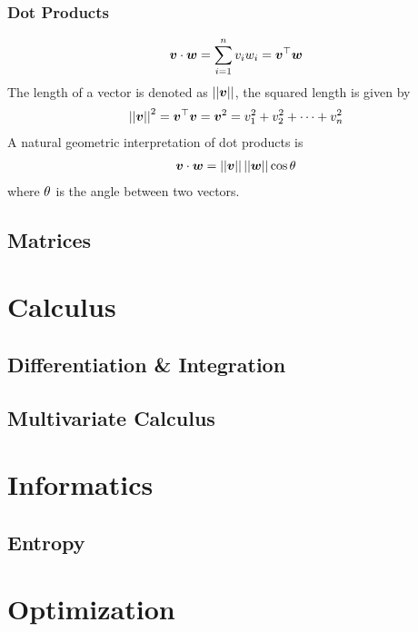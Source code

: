 \subsubsection*{Dot Products}

\begin{align*}
	\boldsymbol{v}\cdot\boldsymbol{w}=\sum_{i=1}^nv_iw_i=\boldsymbol{v}{}^\top\boldsymbol{w}
\end{align*}
The length of a vector is denoted as $\left\vert\left\vert \boldsymbol{v} \right\vert\right\vert$, the squared length is given by
\begin{align*}
	\left\vert\left\vert \boldsymbol{v} \right\vert\right\vert^2=\boldsymbol{v}{}^\top\boldsymbol{v}=\boldsymbol{v}^2=v_1^2+v_2^2+\dots+v_n^2
\end{align*}
A natural geometric interpretation of dot products is
\begin{align*}
	\boldsymbol{v}\cdot\boldsymbol{w}=\left\vert\left\vert \boldsymbol{v} \right\vert\right\vert\left\vert\left\vert \boldsymbol{w} \right\vert\right\vert\cos\theta
\end{align*}
where $\theta$ is the angle between two vectors.

\subsection{Matrices}

\section{Calculus}
\label{section2.3}

\subsection{Differentiation \& Integration}

\subsection{Multivariate Calculus}

\section{Informatics}
\label{section2.4}

\subsection{Entropy}

\section{Optimization}
\label{section2.5}

